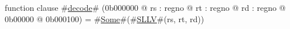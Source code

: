 function clause #\hyperref[zdecode]{decode}# (0b000000 @ rs : regno @ rt : regno @ rd : regno @ 0b00000 @ 0b000100) =
  #\hyperref[zSome]{Some}#(#\hyperref[zSLLV]{SLLV}#(rs, rt, rd))
